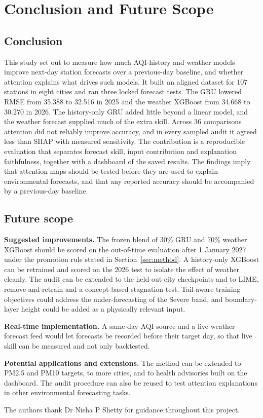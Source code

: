 \documentclass[pdflatex,sn-mathphys-num]{sn-jnl}
\begin{document}
\section{Conclusion and Future Scope}\label{sec:concl}

\subsection{Conclusion}
This study set out to measure how much AQI-history and weather models improve next-day station forecasts over a previous-day baseline, and whether attention explains what drives such models. It built an aligned dataset for 107 stations in eight cities and ran three locked forecast tests. The GRU lowered RMSE from 35.388 to 32.516 in 2025 and the weather XGBoost from 34.668 to 30.270 in 2026. The history-only GRU added little beyond a linear model, and the weather forecast supplied much of the extra skill. Across 36 comparisons attention did not reliably improve accuracy, and in every sampled audit it agreed less than SHAP with measured sensitivity. The contribution is a reproducible evaluation that separates forecast skill, input contribution and explanation faithfulness, together with a dashboard of the saved results. The findings imply that attention maps should be tested before they are used to explain environmental forecasts, and that any reported accuracy should be accompanied by a previous-day baseline.

\subsection{Future scope}
\textbf{Suggested improvements.} The frozen blend of 30\% GRU and 70\% weather XGBoost should be scored on the out-of-time evaluation after 1 January 2027 under the promotion rule stated in Section~\ref{sec:method}. A history-only XGBoost can be retrained and scored on the 2026 test to isolate the effect of weather cleanly. The audit can be extended to the held-out-city checkpoints and to LIME, remove-and-retrain and a concept-based stagnation test. Tail-aware training objectives could address the under-forecasting of the Severe band, and boundary-layer height could be added as a physically relevant input.

\textbf{Real-time implementation.} A same-day AQI source and a live weather forecast feed would let forecasts be recorded before their target day, so that live skill can be measured and not only backtested.

\textbf{Potential applications and extensions.} The method can be extended to PM2.5 and PM10 targets, to more cities, and to health advisories built on the dashboard. The audit procedure can also be reused to test attention explanations in other environmental forecasting tasks.

\backmatter

The authors thank Dr Nisha P Shetty for guidance throughout this project.


\end{document}
